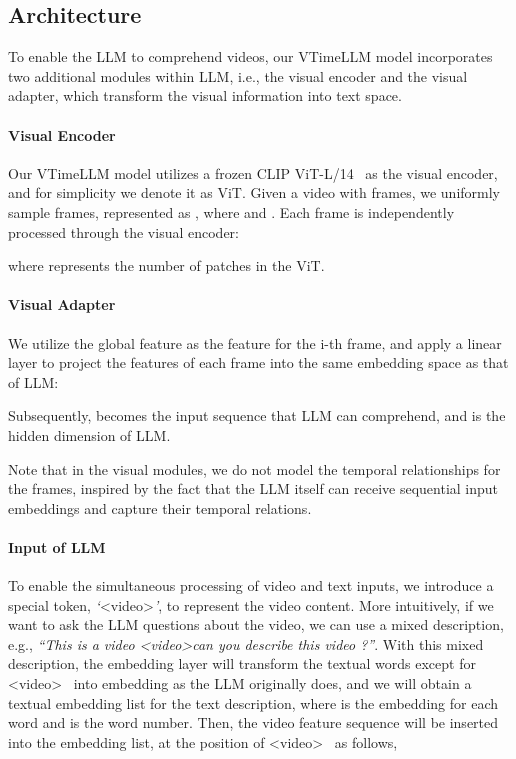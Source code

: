 \documentclass[10pt,twocolumn,letterpaper]{article}
\begin{document}
\subsection{Architecture}

To enable the LLM to comprehend videos, our VTimeLLM model incorporates two additional modules within LLM, i.e., the visual encoder and the visual adapter, which transform the visual information into text space.

\paragraph{Visual Encoder} Our VTimeLLM model utilizes a frozen CLIP ViT-L/14~\cite{clip} as the visual encoder, and for simplicity we denote it as ViT. Given a video  with  frames, we uniformly sample  frames, represented as , where  and  . Each frame  is independently processed through the visual encoder:

where  represents the number of patches in the ViT. 

\paragraph{Visual Adapter}  We utilize the global feature  as the feature for the i-th frame, and apply a linear layer  to project the features of each frame into the same embedding space as that of LLM:

Subsequently,  becomes the input sequence that LLM can comprehend, and  is the hidden dimension of LLM.

Note that in the visual modules, we do not model the temporal relationships for the frames, inspired by the fact that the LLM itself can receive sequential input embeddings and capture their temporal relations.  

\paragraph{Input of LLM} To enable the simultaneous processing of video and text inputs, we introduce a special token, \textit{`}\textless video\textgreater\textit{'}, to represent the video content. More intuitively, if we want to ask the LLM questions about the video, we can use a mixed description, e.g., \textit{``This is a video \textless video\textgreater  can you describe this video ?''}. With this mixed description, the embedding layer will transform the textual words except for \textless video\textgreater ~ into embedding as the LLM originally does, and we will obtain a textual embedding list  for the text description, where  is the embedding for each word and  is the word number. Then, the video feature sequence will be inserted into the embedding list, at the position of \textless video\textgreater ~ as follows,
\end{document}
